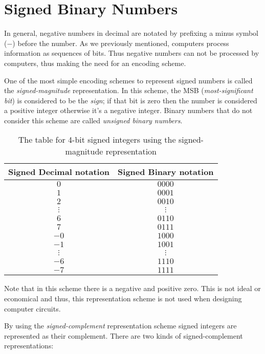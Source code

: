 \section{Signed Binary Numbers}

In general, negative numbers in decimal are notated by prefixing a minus
symbol ($-$) before the number. As we previously mentioned, computers
process information as sequences of bits. Thus negative numbers can not
be processed  by computers, thus making the need for an
encoding scheme.

One of the most simple encoding schemes to represent signed numbers
is called the \textit{signed-magnitude} representation. In this
scheme, the MSB (\textit{most-significant bit}) is considered to be the \textit{sign}; if that
bit is zero then the number is considered a positive integer
otherwise it's a negative integer. Binary numbers that do
not consider this scheme are called \textit{unsigned binary numbers}.

\begin{table}[ht]
    \centering
    \begin{tabular}{c|c}
        Signed Decimal notation & Signed Binary notation \\
        \hline
        $0$ & $0000$ \\
        $1$ & $0001$ \\
        $2$ & $0010$ \\
        $\vdots$ & $\vdots$ \\
        $6$  & $0110$ \\
        $7$  & $0111$ \\
        $-0$ & $1000$ \\
        $-1$ & $1001$ \\
        $\vdots$ & $\vdots$ \\
        $-6$ & $1110$ \\
        $-7$ & $1111$ \\
    \end{tabular}
    \caption{The table for 4-bit signed integers using the signed-magnitude representation}
\end{table}

Note that in this scheme there is a negative and positive zero. This is not ideal or economical 
and thus, this representation scheme is not used when designing computer circuits.

By using the \textit{signed-complement} representation scheme
signed integers are represented as their complement. There
are two kinds of signed-complement representations:

